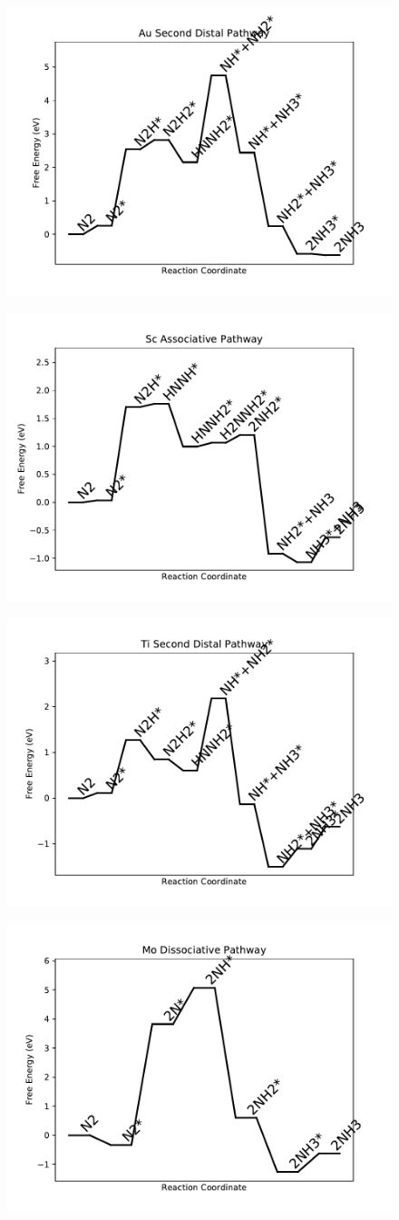 \begin{figure}
\includegraphics[width=0.5\linewidth]{data/plots/Au_distal_2.pdf}
\label{fig:Au_distal_2}
\end{figure}

\begin{figure}
\includegraphics[width=0.5\linewidth]{data/plots/Sc_associative.pdf}
\label{fig:Sc_associative}
\end{figure}

\begin{figure}
\includegraphics[width=0.5\linewidth]{data/plots/Ti_distal_2.pdf}
\label{fig:Ti_distal_2}
\end{figure}

\begin{figure}
\includegraphics[width=0.5\linewidth]{data/plots/Mo_dissociative.pdf}
\label{fig:Mo_dissociative}
\end{figure}

